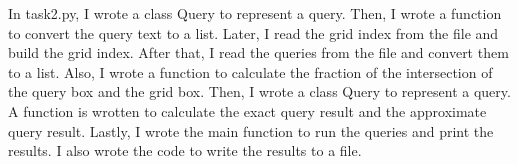 \documentclass{article}
\begin{document}
In task2.py, I wrote a class Query to represent a query. 
Then, I wrote a function to convert the query text to a list. 
Later, I read the grid index from the file and build the grid index. 
After that, I read the queries from the file and convert them to a list. 
Also, I wrote a function to calculate the fraction of the intersection of the query box and the grid box.
Then, I wrote a class Query to represent a query. 
A function is wrotten to calculate the exact query result and the approximate query result. Lastly, I wrote the main function to run the queries and print the results. I also wrote the code to write the results to a file.
\end{document}
